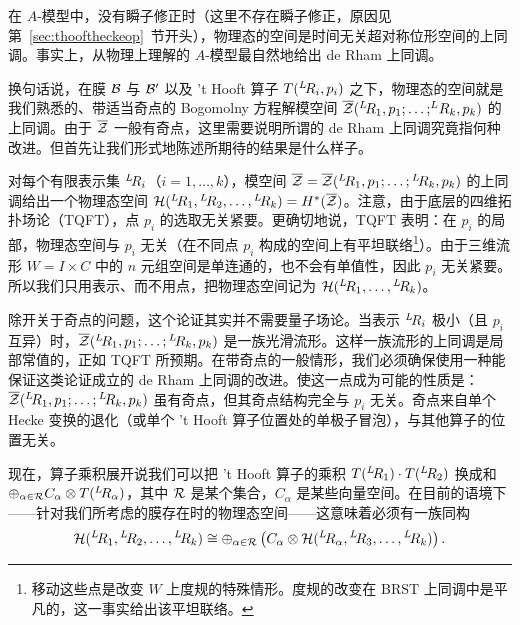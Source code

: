 \par{}

在 $A$-模型中，没有瞬子修正时（这里不存在瞬子修正，原因见第~\ref{sec:thooftheckeop}~节开头），物理态的空间是时间无关超对称位形空间的上同调。事实上，从物理上理解的 $A$-模型最自然地给出 de Rham 上同调。

换句话说，在膜 ${\cal B}$ 与 ${\cal B}'$ 以及 't Hooft 算子 $T(^L\negthinspace R_i,p_i)$ 之下，物理态的空间就是我们熟悉的、带适当奇点的 Bogomolny 方程解模空间 $\bar\EUZ(^L\negthinspace R_1,p_1;\dots;^L\neg R_k,p_k)$ 的上同调。由于 $\bar\EUZ$ 一般有奇点，这里需要说明所谓的 de Rham 上同调究竟指何种改进。但首先让我们形式地陈述所期待的结果是什么样子。

对每个有限表示集 $^L\negthinspace R_i$（$i=1,\dots,k$），模空间 $\bar\EUZ=\bar\EUZ(^L\negthinspace R_1,p_1;\dots;{}^L\neg R_k,p_k)$ 的上同调给出一个物理态空间 ${\cal H}({}^L\negthinspace R_1,{}^L\negthinspace R_2,\dots,{}^L\negthinspace R_k)=H^*(\bar\EUZ)$。注意，由于底层的四维拓扑场论（TQFT），点 $p_i$ 的选取无关紧要。更确切地说，TQFT 表明：在 $p_i$ 的局部，物理态空间与 $p_i$ 无关（在不同点 $p_i$ 构成的空间上有平坦联络\footnote{移动这些点是改变 $W$ 上度规的特殊情形。度规的改变在 BRST 上同调中是平凡的，这一事实给出该平坦联络。}）。由于三维流形 $W=I\times C$ 中的 $n$ 元组空间是单连通的，也不会有单值性，因此 $p_i$ 无关紧要。所以我们只用表示、而不用点，把物理态空间记为 ${\cal H}({}^L\negthinspace R_1,\dots,{}^L\negthinspace R_k)$。

除开关于奇点的问题，这个论证其实并不需要量子场论。当表示 $^L\negthinspace R_i$ 极小（且 $p_i$ 互异）时，$\bar\EUZ(^L\negthinspace R_1,p_1;\dots;{}^L\neg R_k,p_k)$ 是一族光滑流形。这样一族流形的上同调是局部常值的，正如 TQFT 所预期。在带奇点的一般情形，我们必须确保使用一种能保证这类论证成立的 de Rham 上同调的改进。使这一点成为可能的性质是：$\bar\EUZ(^L\negthinspace R_1,p_1;\dots;{}^L\neg R_k,p_k)$ 虽有奇点，但其奇点结构完全与 $p_i$ 无关。奇点来自单个 Hecke 变换的退化（或单个 't Hooft 算子位置处的单极子冒泡），与其他算子的位置无关。

现在，算子乘积展开说我们可以把 't Hooft 算子的乘积 $T(^L\negthinspace R_1)\cdot T(^L\negthinspace R_2)$ 换成和 $\oplus_{\alpha\in \EUR}C_\alpha\otimes T(^L\negthinspace R_\alpha)$，其中 $\EUR$ 是某个集合，$C_\alpha$ 是某些向量空间。在目前的语境下——针对我们所考虑的膜存在时的物理态空间——这意味着必须有一族同构 %
\setcounter{equation}{23}
\begin{equation}\label{eq:mitrox}
{\cal
H}({}^L\negthinspace R_1,{}^L\negthinspace
R_2,\dots,{}^L\negthinspace R_k)\cong\oplus_{\alpha\in
\EUR}\left(C_\alpha \otimes{\cal H}({}^L\negthinspace
R_\alpha,{}^L\negthinspace R_3,\dots,{}^L\negthinspace R_k)\right).
\end{equation}

